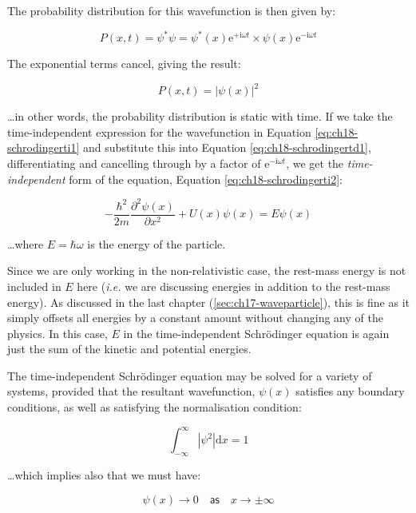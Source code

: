 \documentclass[
]{book}
\begin{document}
The probability distribution for this wavefunction is then given by:

\begin{equation}
P(x,t) = \psi^* \psi = \psi^*(x) \mathrm{e}^{+\mathrm{i}\omega t} \times \psi(x) \mathrm{e}^{-\mathrm{i}\omega t}
\end{equation}

The exponential terms cancel, giving the result:

\begin{equation}
P(x,t) = |\psi(x)|^2
\end{equation}

\ldots in other words, the probability distribution is static with time. If we take the time-independent expression for the wavefunction in Equation \eqref{eq:ch18-schrodingerti1} and substitute this into Equation \eqref{eq:ch18-schrodingertd1}, differentiating and cancelling through by a factor of \(\mathrm{e}^{-\mathrm{i}\omega t}\), we get the \emph{time-independent} form of the equation, Equation \eqref{eq:ch18-schrodingerti2}:

\begin{equation}
-\frac{\hbar^2}{2m} \frac{\partial^2 \psi(x)}{\partial x^2} + U(x) \psi(x) =  E \psi(x)
\label{eq:ch18-schrodingerti2}
\end{equation}

\ldots where \(E = \hbar \omega\) is the energy of the particle.

Since we are only working in the non-relativistic case, the rest-mass energy is not included in \(E\) here (\emph{i.e.} we are discussing energies in addition to the rest-mass energy). As discussed in the last chapter (\ref{sec:ch17-waveparticle}), this is fine as it simply offsets all energies by a constant amount without changing any of the physics. In this case, \(E\) in the time-independent Schrödinger equation is again just the sum of the kinetic and potential energies.

The time-independent Schrödinger equation may be solved for a variety of systems, provided that the resultant wavefunction, \(\psi(x)\) satisfies any boundary conditions, as well as satisfying the normalisation condition:

\begin{equation}
\int_{-\infty}^{\infty} |\psi^2| \mathrm{d}x = 1
\end{equation}

\ldots which implies also that we must have:

\begin{equation}
\psi(x) \rightarrow 0 \quad \textsf{as} \quad x \rightarrow \pm \infty
\end{equation}
\end{document}
